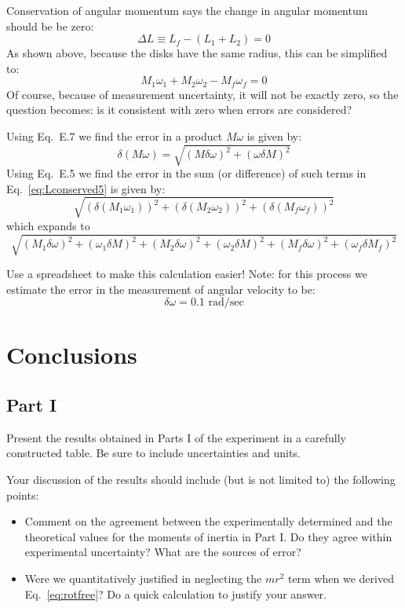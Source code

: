 Conservation of angular momentum says the change in
angular momentum should be be zero:
\begin{equation}
\Delta L \equiv L_{f} -(L_{1} + L_{2})=0
\end{equation}
As shown above, because the disks have the same radius, this can be simplified to:
\begin{equation}
M_1 \omega_1+M_2 \omega_2 -M_f  \omega_f = 0\label{eq:Lconserved5}
\end{equation}
Of course, because of measurement uncertainty, it will not be exactly zero,
so the question becomes: is it consistent with zero when errors are considered?

Using Eq.~E.7 we find the error in a product $M\omega$ is given by:
\begin{equation}
\delta(M\omega)=\sqrt{(M\delta \omega)^2+(\omega\delta M)^2}
\end{equation}
Using Eq.~E.5 we find the error in the sum (or difference) of such terms in
Eq.~\ref{eq:Lconserved5} is given by:
\begin{equation}
\sqrt{\left(\delta(M_1 \omega_1)\right)^2+\left(\delta(M_2 \omega_2)\right)^2+\left(\delta(M_f \omega_f)\right)^2}
\end{equation}
which expands to
\begin{equation}
\sqrt{(M_1\delta \omega)^2+(\omega_1\delta M)^2+(M_2\delta \omega)^2+(\omega_2\delta M)^2+(M_f\delta \omega)^2+(\omega_f\delta M_f)^2}
\end{equation}

Use a spreadsheet to make this calculation easier! Note: for this process we estimate the
error in the measurement of angular velocity to be:
\begin{equation}
\delta\omega = 0.1\mbox{ rad/sec}
\end{equation}

\section*{Conclusions}
\subsection*{Part I}
Present the results obtained in Parts I of the experiment in a
carefully constructed table.  Be sure to include uncertainties and units.

Your discussion of the results should include (but is not limited to)
the following points:
\begin{itemize}
\item Comment on the agreement between the experimentally determined
and the
theoretical values for the moments of inertia in Part I.  Do they
agree within experimental uncertainty?  What are the sources of error?
\item Were we quantitatively justified in neglecting the $mr^2$ term
when we derived Eq.~\ref{eq:rotfree}?  Do a quick calculation to
justify your answer.
\end{itemize}

